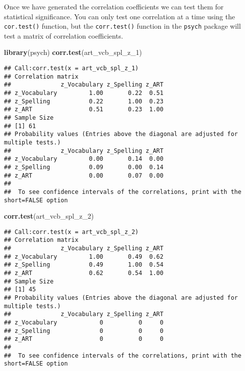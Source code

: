 \documentclass[
]{article}
\newenvironment{Shaded}{\begin{snugshade}}{\end{snugshade}}
\newcommand{\FunctionTok}[1]{\textcolor[rgb]{0.13,0.29,0.53}{\textbf{#1}}}
\newcommand{\NormalTok}[1]{#1}
\begin{document}
Once we have generated the correlation coefficients we can test them for
statistical significance. You can only test one correlation at a time
using the \texttt{cor.test()} function, but the \texttt{corr.test()}
function in the \texttt{psych} package will test a matrix of correlation
coefficients.

\begin{Shaded}
\begin{Highlighting}[]
\FunctionTok{library}\NormalTok{(psych)}
\FunctionTok{corr.test}\NormalTok{(art\_vcb\_spl\_z\_1) }
\end{Highlighting}
\end{Shaded}

\begin{verbatim}
## Call:corr.test(x = art_vcb_spl_z_1)
## Correlation matrix 
##              z_Vocabulary z_Spelling z_ART
## z_Vocabulary         1.00       0.22  0.51
## z_Spelling           0.22       1.00  0.23
## z_ART                0.51       0.23  1.00
## Sample Size 
## [1] 61
## Probability values (Entries above the diagonal are adjusted for multiple tests.) 
##              z_Vocabulary z_Spelling z_ART
## z_Vocabulary         0.00       0.14  0.00
## z_Spelling           0.09       0.00  0.14
## z_ART                0.00       0.07  0.00
## 
##  To see confidence intervals of the correlations, print with the short=FALSE option
\end{verbatim}

\begin{Shaded}
\begin{Highlighting}[]
\FunctionTok{corr.test}\NormalTok{(art\_vcb\_spl\_z\_2) }
\end{Highlighting}
\end{Shaded}

\begin{verbatim}
## Call:corr.test(x = art_vcb_spl_z_2)
## Correlation matrix 
##              z_Vocabulary z_Spelling z_ART
## z_Vocabulary         1.00       0.49  0.62
## z_Spelling           0.49       1.00  0.54
## z_ART                0.62       0.54  1.00
## Sample Size 
## [1] 45
## Probability values (Entries above the diagonal are adjusted for multiple tests.) 
##              z_Vocabulary z_Spelling z_ART
## z_Vocabulary            0          0     0
## z_Spelling              0          0     0
## z_ART                   0          0     0
## 
##  To see confidence intervals of the correlations, print with the short=FALSE option
\end{verbatim}
\end{document}
